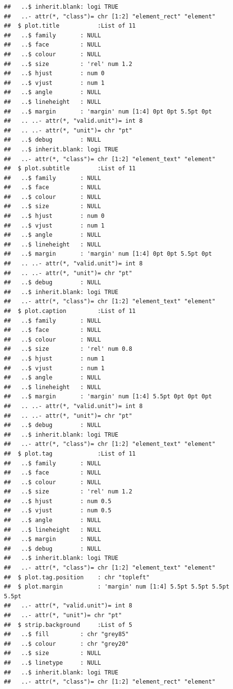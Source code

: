 \documentclass[]{article}
\begin{document}
\begin{verbatim}
##   ..$ inherit.blank: logi TRUE
##   ..- attr(*, "class")= chr [1:2] "element_rect" "element"
##  $ plot.title           :List of 11
##   ..$ family       : NULL
##   ..$ face         : NULL
##   ..$ colour       : NULL
##   ..$ size         : 'rel' num 1.2
##   ..$ hjust        : num 0
##   ..$ vjust        : num 1
##   ..$ angle        : NULL
##   ..$ lineheight   : NULL
##   ..$ margin       : 'margin' num [1:4] 0pt 0pt 5.5pt 0pt
##   .. ..- attr(*, "valid.unit")= int 8
##   .. ..- attr(*, "unit")= chr "pt"
##   ..$ debug        : NULL
##   ..$ inherit.blank: logi TRUE
##   ..- attr(*, "class")= chr [1:2] "element_text" "element"
##  $ plot.subtitle        :List of 11
##   ..$ family       : NULL
##   ..$ face         : NULL
##   ..$ colour       : NULL
##   ..$ size         : NULL
##   ..$ hjust        : num 0
##   ..$ vjust        : num 1
##   ..$ angle        : NULL
##   ..$ lineheight   : NULL
##   ..$ margin       : 'margin' num [1:4] 0pt 0pt 5.5pt 0pt
##   .. ..- attr(*, "valid.unit")= int 8
##   .. ..- attr(*, "unit")= chr "pt"
##   ..$ debug        : NULL
##   ..$ inherit.blank: logi TRUE
##   ..- attr(*, "class")= chr [1:2] "element_text" "element"
##  $ plot.caption         :List of 11
##   ..$ family       : NULL
##   ..$ face         : NULL
##   ..$ colour       : NULL
##   ..$ size         : 'rel' num 0.8
##   ..$ hjust        : num 1
##   ..$ vjust        : num 1
##   ..$ angle        : NULL
##   ..$ lineheight   : NULL
##   ..$ margin       : 'margin' num [1:4] 5.5pt 0pt 0pt 0pt
##   .. ..- attr(*, "valid.unit")= int 8
##   .. ..- attr(*, "unit")= chr "pt"
##   ..$ debug        : NULL
##   ..$ inherit.blank: logi TRUE
##   ..- attr(*, "class")= chr [1:2] "element_text" "element"
##  $ plot.tag             :List of 11
##   ..$ family       : NULL
##   ..$ face         : NULL
##   ..$ colour       : NULL
##   ..$ size         : 'rel' num 1.2
##   ..$ hjust        : num 0.5
##   ..$ vjust        : num 0.5
##   ..$ angle        : NULL
##   ..$ lineheight   : NULL
##   ..$ margin       : NULL
##   ..$ debug        : NULL
##   ..$ inherit.blank: logi TRUE
##   ..- attr(*, "class")= chr [1:2] "element_text" "element"
##  $ plot.tag.position    : chr "topleft"
##  $ plot.margin          : 'margin' num [1:4] 5.5pt 5.5pt 5.5pt 5.5pt
##   ..- attr(*, "valid.unit")= int 8
##   ..- attr(*, "unit")= chr "pt"
##  $ strip.background     :List of 5
##   ..$ fill         : chr "grey85"
##   ..$ colour       : chr "grey20"
##   ..$ size         : NULL
##   ..$ linetype     : NULL
##   ..$ inherit.blank: logi TRUE
##   ..- attr(*, "class")= chr [1:2] "element_rect" "element"

\end{verbatim}
\end{document}

